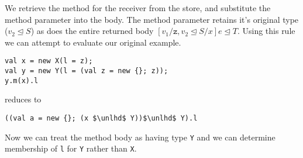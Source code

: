 \documentclass{llncs}
\begin{document}
We retrieve the method for the receiver from the store, and substitute 
the method parameter into the body. The method parameter retains it's 
original type ($v_2 \unlhd S$) as does the entire returned body 
$[v_1/\texttt{z},v_2 \unlhd S/x]e \unlhd T$. Using this rule we 
can attempt to evaluate our original example.
\begin{lstlisting}[mathescape, style=custom_lang]
val x = new X(l = z);
val y = new Y(l = (val z = new {}; z));
y.m(x).l
\end{lstlisting}
reduces to
\begin{lstlisting}[mathescape, style=custom_lang]
((val a = new {}; (x $\unlhd$ Y))$\unlhd$ Y).l
\end{lstlisting}
Now we can treat the method body as having type \texttt{Y} and 
we can determine membership of \texttt{l} for \texttt{Y} rather 
than \texttt{X}.
\end{document}
